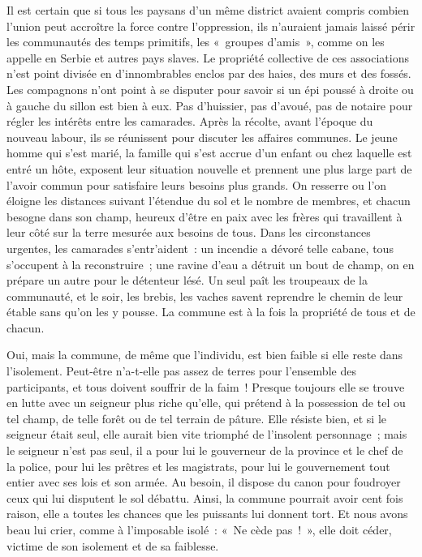 \documentclass[french,twoside]{book} %
\begin{document}
Il est certain que si tous les paysans d’un même district avaient compris combien l’union peut accroître la force contre l’oppression, ils n’auraient jamais laissé périr les communautés des temps primitifs, les « groupes d’amis », comme on les appelle en Serbie et autres pays slaves. Le propriété collective de ces associations n’est point divisée en d’innombrables enclos par des haies, des murs et des fossés. Les compagnons n’ont point à se  disputer pour savoir si un épi poussé à droite ou à gauche du sillon est bien à eux. Pas d’huissier, pas d’avoué, pas de notaire pour régler les intérêts entre les camarades. Après la récolte, avant l’époque du nouveau labour, ils se réunissent pour discuter les affaires communes. Le jeune homme qui s’est marié, la famille qui s’est accrue d’un enfant ou chez laquelle est entré un hôte, exposent leur situation nouvelle et prennent une plus large part de l’avoir commun pour satisfaire leurs besoins plus grands. On resserre ou l’on éloigne les distances suivant l’étendue du sol et le nombre de membres, et chacun besogne dans son champ, heureux d’être en paix avec les frères qui travaillent à leur côté sur la terre mesurée aux besoins de tous. Dans les circonstances urgentes, les camarades s’entr’aident : un incendie a dévoré telle cabane, tous s’occupent à la reconstruire ; une ravine d’eau a détruit un bout de champ, on en prépare un autre pour le détenteur lésé. Un seul paît les troupeaux de la communauté, et le soir, les brebis, les vaches savent reprendre le chemin de leur étable sans qu’on les y pousse. La commune est à la fois la propriété de tous et de chacun.\par
Oui, mais la commune, de même que l’individu, est bien faible si elle reste dans l’isolement.  Peut-être n’a-t-elle pas assez de terres pour l’ensemble des participants, et tous doivent souffrir de la faim ! Presque toujours elle se trouve en lutte avec un seigneur plus riche qu’elle, qui prétend à la possession de tel ou tel champ, de telle forêt ou de tel terrain de pâture. Elle résiste bien, et si le seigneur était seul, elle aurait bien vite triomphé de l’insolent personnage ; mais le seigneur n’est pas seul, il a pour lui le gouverneur de la province et le chef de la police, pour lui les prêtres et les magistrats, pour lui le gouvernement tout entier avec ses lois et son armée. Au besoin, il dispose du canon pour foudroyer ceux qui lui disputent le sol débattu. Ainsi, la commune pourrait avoir cent fois raison, elle a toutes les chances que les puissants lui donnent tort. Et nous avons beau lui crier, comme à l’imposable isolé : « Ne cède pas ! », elle doit céder, victime de son isolement et de sa faiblesse.\par
\end{document}
